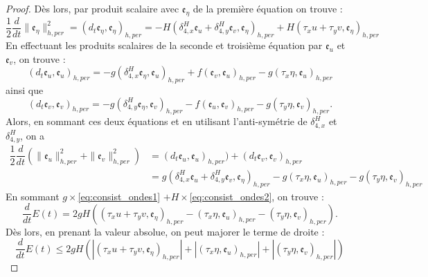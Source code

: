 \begin{proof}
Dès lors, par produit scalaire avec $\mathfrak{e}_{\eta}$ de la première équation on trouve :
\begin{equation}
\dfrac{1}{2} \dfrac{d}{dt} \| \mathfrak{e}_{\eta} \|_{h,per}^2 = (d_t \mathfrak{e}_{\eta}, \mathfrak{e}_{\eta})_{h,per} = - H ( \delta_{4,x}^H \mathfrak{e}_{u} + \delta_{4,y}^H \mathfrak{e}_{v}, \mathfrak{e}_{\eta})_{h,per}  + H ( \tau_x u + \tau_y v, \mathfrak{e}_{\eta})_{h,per}
\label{eq:consist_ondes1}
\end{equation}
En effectuant les produits scalaires de la seconde et troisième équation par $\mathfrak{e}_u$ et $\mathfrak{e}_v$, on trouve :
\begin{equation}
(d_t \mathfrak{e}_u, \mathfrak{e}_u)_{h,per} = - g (\delta_{4,x}^H \mathfrak{e}_{\eta}, \mathfrak{e}_u)_{h,per} + f(\mathfrak{e}_v, \mathfrak{e}_u)_{h,per} - g(\tau_x \eta, \mathfrak{e}_u)_{h,per}
\end{equation}
ainsi que 
\begin{equation}
(d_t \mathfrak{e}_v, \mathfrak{e}_v)_{h,per} = - g (\delta_{4,y}^H \mathfrak{e}_{\eta}, \mathfrak{e}_v)_{h,per} - f(\mathfrak{e}_u, \mathfrak{e}_v)_{h,per} - g(\tau_y \eta, \mathfrak{e}_v)_{h,per}.
\end{equation}
Alors, en sommant ces deux équations et en utilisant l’anti-symétrie de $\delta_{4,x}^H$ et $\delta_{4,y}^H$, on a
\begin{align}
\dfrac{1}{2} \dfrac{d}{dt} \left( \| \mathfrak{e}_{u} \|_{h,per}^2 + \| \mathfrak{e}_{v} \|_{h,per}^2 \right) & = (d_t \mathfrak{e}_u, \mathfrak{e}_u)_{h,per}) + (d_t \mathfrak{e}_v, \mathfrak{e}_v)_{h,per} \\
& = g (\delta_{4,x}^H \mathfrak{e}_u + \delta_{4,y}^H \mathfrak{e}_v, \mathfrak{e}_{\eta})_{h,per} - g(\tau_x \eta, \mathfrak{e}_u)_{h,per} - g(\tau_y \eta, \mathfrak{e}_v)_{h,per}
\label{eq:consist_ondes2}
\end{align}
En sommant $g \times $\eqref{eq:consist_ondes1} $+ H \times$\eqref{eq:consist_ondes2}, on trouve :
\begin{equation}
\dfrac{d}{dt} E(t) = 2 g H \left( (\tau_x u + \tau_y v, \mathfrak{e}_{\eta})_{h,per} - (\tau_x \eta, \mathfrak{e}_u )_{h,per} - (\tau_y \eta, \mathfrak{e}_v )_{h,per} \right).
\end{equation}
Dès lors, en prenant la valeur absolue, on peut majorer le terme de droite :
\begin{equation}
\dfrac{d}{dt} E(t) \leq 2 g H \left( |(\tau_x u + \tau_y v, \mathfrak{e}_{\eta})_{h,per}| + |(\tau_x \eta, \mathfrak{e}_u )_{h,per}| + |(\tau_y \eta, \mathfrak{e}_v )_{h,per}|  \right)

\end{equation}
\end{proof}
